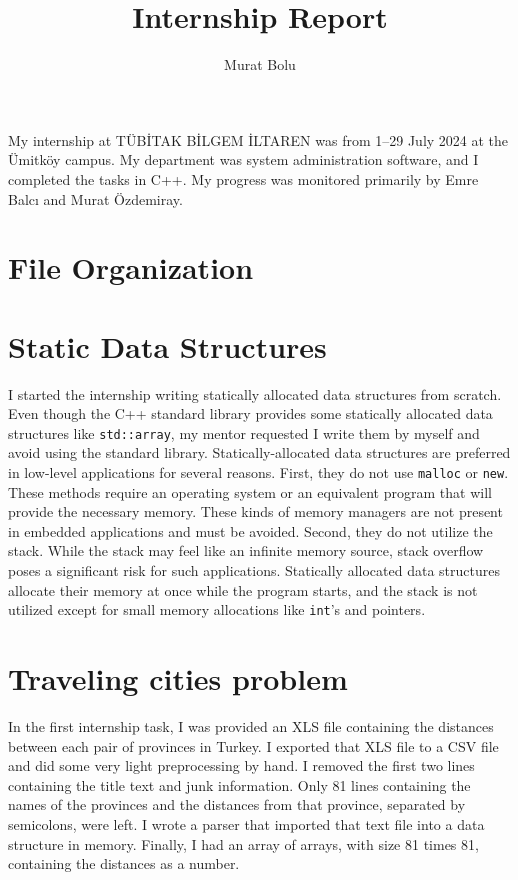 \documentclass[12pt,a4paper]{article}
\title{Internship Report}
\author{Murat Bolu}
\begin{document}
\maketitle

My internship at TÜBİTAK BİLGEM İLTAREN was from 1--29 July 2024 at the Ümitköy
campus. My department was system administration software, and I completed the
tasks in C++. My progress was monitored primarily by Emre Balcı and Murat
Özdemiray.

\section{File Organization}

\section{Static Data Structures}

I started the internship writing statically allocated data structures from
scratch. Even though the C++ standard library provides some statically allocated
data structures like \texttt{std::array}, my mentor requested I write them by
myself and avoid using the standard library. Statically-allocated data
structures are preferred in low-level applications for several reasons. First,
they do not use \texttt{malloc} or \texttt{new}. These methods require an
operating system or an equivalent program that will provide the necessary
memory. These kinds of memory managers are not present in embedded applications
and must be avoided. Second, they do not utilize the stack. While the stack may
feel like an infinite memory source, stack overflow poses a significant risk for
such applications. Statically allocated data structures allocate their memory at
once while the program starts, and the stack is not utilized except for small
memory allocations like \texttt{int}'s and pointers.

\section{Traveling cities problem}

In the first internship task, I was provided an XLS file containing the
distances between each pair of provinces in Turkey. I exported that XLS file to
a CSV file and did some very light preprocessing by hand. I removed the first
two lines containing the title text and junk information. Only 81 lines
containing the names of the provinces and the distances from that province,
separated by semicolons, were left. I wrote a parser that imported that text
file into a data structure in memory. Finally, I had an array of arrays, with
size 81 times 81, containing the distances as a number.
\end{document}
